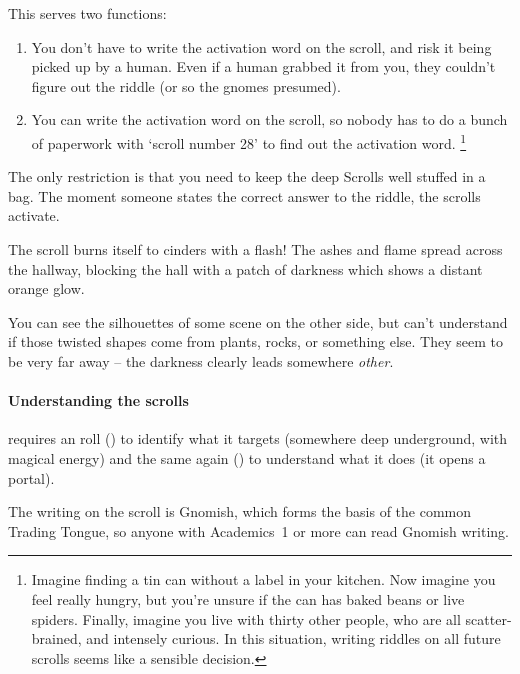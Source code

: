 \begin{multicols}{2}
This serves two functions:

\begin{enumerate}
  \item
  You don't have to write the activation word on the scroll, and risk it being picked up by a human.
  Even if a human grabbed it from you, they couldn't figure out the riddle (or so the gnomes presumed).
  \item
  You can write the activation word on the scroll, so nobody has to do a bunch of paperwork with `scroll number 28' to find out the activation word.%
  \footnote{Imagine finding a tin can without a label in your kitchen.
  Now imagine you feel really hungry, but you're unsure if the can has baked beans or live spiders.
  Finally, imagine you live with thirty other people, who are all scatter-brained, and intensely curious.
  In this situation, writing riddles on all future scrolls seems like a sensible decision.}
\end{enumerate}

The only restriction is that you need to keep the \Gls{deep} Scrolls well stuffed in a bag.
The moment someone states the correct answer to the riddle, the scrolls activate.

\labyrinthScroll

\showTalisman

\begin{boxtext}
  The scroll burns itself to cinders with a flash!
  The ashes and flame spread across the hallway, blocking the hall with a patch of darkness which shows a distant orange glow.

  You can see the silhouettes of some scene on the other side, but can't understand if those twisted shapes come from plants, rocks, or something else.
  They seem to be very far away -- the darkness clearly leads somewhere \emph{other}.
\end{boxtext}

\paragraph{Understanding the scrolls}
requires an  roll (\tn[12]) to identify what it targets (somewhere deep underground, with magical energy) and the same again (\tn[14]) to understand what it does (it opens a portal).

\label{readingScrolls}
The writing on the scroll is Gnomish, which forms the basis of the common Trading Tongue, so anyone with Academics~1 or more can read Gnomish writing.


\end{multicols}
